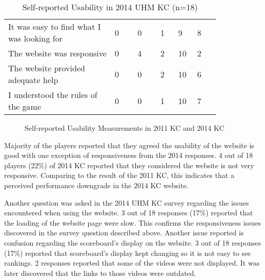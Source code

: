 \begin{table}[ht!]
  \centering
  \begin{tabular} {|P{0.42\linewidth}|P{0.09\linewidth}|p{0.09\linewidth}|p{0.075\linewidth}|p{0.06\linewidth}|P{0.09\linewidth}|}
    \hline
    \centering {} &  &  &  &  & \\
    \hline
It was easy to find what I was looking for & 0 & 0 & 1 & 9 & 8\\
    \hline
The website was responsive & 0 & 4 & 2 & 10 & 2 \\
    \hline
The website provided adequate help & 0 & 0 & 2 & 10 & 6 \\
    \hline
I understood the rules of the game & 0 & 0 & 1 & 10 & 7 \\
    \hline 
  \end{tabular}
  \caption{Self-reported Usability in 2014 UHM KC (n=18)}
  \label{table:self-report-usability-2014}
\end{table}

\begin{figure}[ht!]
	\centering
		\caption{Self-reported Usability Measurements in 2011 KC and 2014 KC}
		\label{fig:self-report-usability-2011-2014}
\end{figure}

Majority of the players reported that they agreed the usability of the website is good with one exception of responsiveness from the 2014 responses. 4 out of 18 players (22\%) of 2014 KC reported that they considered the website is not very responsive. Comparing to the result of the 2011 KC, this indicates that a perceived performance downgrade in the 2014 KC website.

Another question was asked in the 2014 UHM KC survey regarding the issues encountered when using the website. 3 out of 18 responses (17\%) reported that the loading of the website page were slow. This confirms the responsiveness issues discovered in the survey question described above. Another issue reported is confusion regarding the scoreboard's display on the website. 3 out of 18 responses (17\%) reported that scoreboard's display kept changing so it is not easy to see rankings. 2 responses reported that some of the videos were not displayed. It was later discovered that the links to those videos were outdated.

